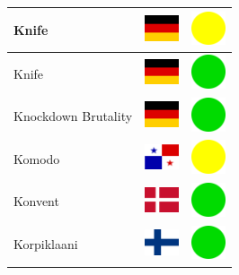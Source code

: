 \documentclass[12pt, a4paper, twoside]{report}
\begin{document}
\begin{center}
\begin{longtable}{|p{5cm}|p{2cm}|p{2cm}|}
 Knife                                                      & \includegraphics[width=1cm]{../4x3/de} &   \includegraphics[width=1cm]{../likes/m} \\ \hline
 Knife                                                      & \includegraphics[width=1cm]{../4x3/de} &   \includegraphics[width=1cm]{../likes/y} \\ \hline
 Knockdown Brutality                                        & \includegraphics[width=1cm]{../4x3/de} &   \includegraphics[width=1cm]{../likes/y} \\ \hline
 Komodo                                                     & \includegraphics[width=1cm]{../4x3/pa} &   \includegraphics[width=1cm]{../likes/m} \\ \hline
 Konvent                                                    & \includegraphics[width=1cm]{../4x3/dk} &   \includegraphics[width=1cm]{../likes/y} \\ \hline
 Korpiklaani                                                & \includegraphics[width=1cm]{../4x3/fi} &   \includegraphics[width=1cm]{../likes/y} \\ \hline

\end{longtable}
\end{center}
\end{document}
